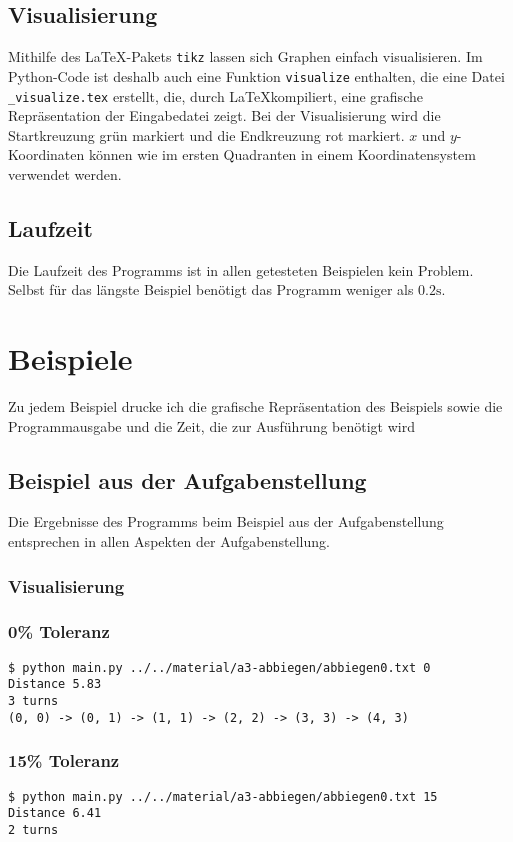 \documentclass[a4paper,10pt,ngerman]{scrartcl}
\begin{document}
\subsection{Visualisierung}
Mithilfe des \LaTeX-Pakets \texttt{tikz} lassen sich Graphen einfach visualisieren.
Im Python-Code ist deshalb auch eine Funktion \texttt{visualize} enthalten, die eine Datei \texttt{\_visualize.tex} erstellt, die, durch \LaTeX kom\-pi\-liert, eine grafische Repräsentation der Eingabedatei zeigt.
Bei der Visualisierung wird die Startkreuzung grün markiert und die Endkreuzung rot markiert.
$x$ und $y$-Koordinaten können wie im ersten Quadranten in einem Koordinatensystem verwendet werden.

\subsection{Laufzeit}
Die Laufzeit des Programms ist in allen getesteten Beispielen kein Problem.
Selbst für das längste Beispiel benötigt das Programm weniger als $0.2 \textrm{s}$.

\section{Beispiele}
Zu jedem Beispiel drucke ich die grafische Repräsentation des Beispiels sowie die Programmausgabe und die Zeit, die zur Ausführung benötigt wird

\subsection{Beispiel aus der Aufgabenstellung}
Die Ergebnisse des Programms beim Beispiel aus der Aufgabenstellung entsprechen in allen Aspekten der Aufgabenstellung.
\subsubsection{Visualisierung}


\subsubsection{0\% Toleranz}
\begin{lstlisting}
$ python main.py ../../material/a3-abbiegen/abbiegen0.txt 0
Distance 5.83
3 turns
(0, 0) -> (0, 1) -> (1, 1) -> (2, 2) -> (3, 3) -> (4, 3)
\end{lstlisting}

\subsubsection{15\% Toleranz}
\begin{lstlisting}
$ python main.py ../../material/a3-abbiegen/abbiegen0.txt 15
Distance 6.41
2 turns
\end{lstlisting}
\end{document}
